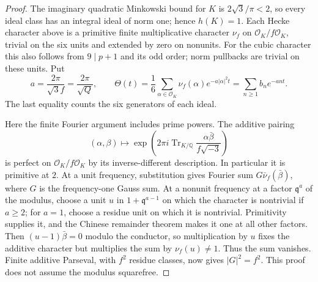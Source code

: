\begin{proof}
The imaginary quadratic Minkowski bound for $K$ is
$2\sqrt3/\pi<2$, so every ideal class has an integral ideal of
norm one; hence $h(K)=1$.
Each Hecke character above is a primitive finite multiplicative
character $\nu_f$ on $\mathcal O_K/f\mathcal O_K$, trivial on the
six units and extended by zero on nonunits.
For the cubic character this also follows from $9\mid p+1$ and
its odd order; norm pullbacks are trivial on these units.
Put
\[
 a=\frac{2\pi}{\sqrt3 f}=\frac{2\pi}{\sqrt Q},\qquad
 \Theta(t)=\frac16\sum_{\alpha\in\mathcal O_K}
        \nu_f(\alpha)e^{-a|\alpha|^2t}
        =\sum_{n\ge1}b_n e^{-ant}.
 \tag{TQC.22}
\]
The last equality counts the six generators of each ideal.

Here the finite Fourier argument includes prime powers.
The additive pairing
\[
 (\alpha,\beta)\longmapsto
 \exp\left(2\pi i\operatorname{Tr}_{K/\mathbb Q}
               \frac{\alpha\bar\beta}{f\sqrt{-3}}\right)
 \tag{TQC.23}
\]
is perfect on $\mathcal O_K/f\mathcal O_K$ by its inverse-different
description.  In particular it is primitive at $2$.
At a unit frequency, substitution gives Fourier sum
$G\bar\nu_f(\bar\beta)$, where $G$ is the frequency-one Gauss sum.
At a nonunit frequency at a factor $\mathfrak q^a$ of the modulus,
choose a unit $u$ in $1+\mathfrak q^{a-1}$ on which the character
is nontrivial if $a\ge2$; for $a=1$, choose a residue unit on which
it is nontrivial.  Primitivity supplies it, and the Chinese remainder
theorem makes it one at all other factors.
Then $(u-1)\bar\beta=0$ modulo the conductor, so multiplication
by $u$ fixes the additive character but multiplies the sum by
$\nu_f(u)\ne1$.  Thus the sum vanishes.
Finite additive Parseval, with $f^2$ residue classes, now gives
$|G|^2=f^2$.  This proof does not assume the modulus squarefree.


\end{proof}
